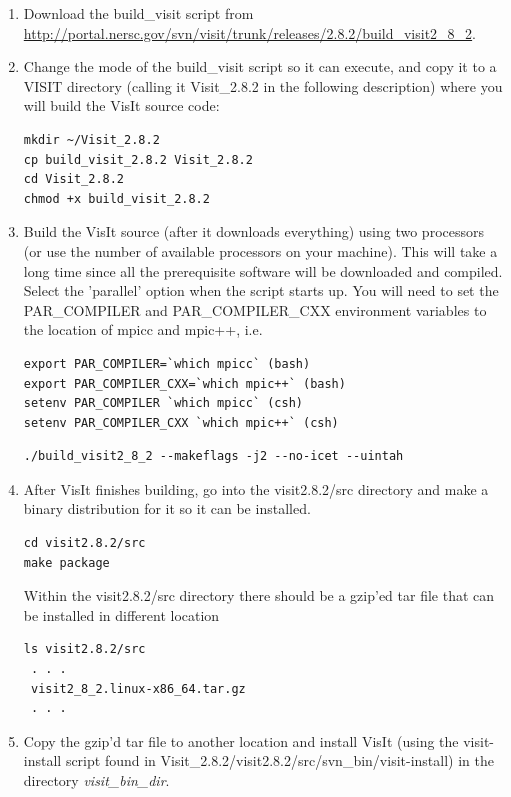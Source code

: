 \documentclass[12pt]{article}
\begin{document}
\begin{enumerate}
\item Download the build\_visit script from
  \url{http://portal.nersc.gov/svn/visit/trunk/releases/2.8.2/build_visit2_8_2}.


\item Change the mode of the build\_visit script so it can execute, and
  copy it to a VISIT directory (calling it Visit\_2.8.2 in the
  following description) where you will build the VisIt source code:
\begin{verbatim}
mkdir ~/Visit_2.8.2
cp build_visit_2.8.2 Visit_2.8.2
cd Visit_2.8.2
chmod +x build_visit_2.8.2
\end{verbatim}

\item Build the VisIt source (after it downloads everything) using two
  processors (or use the number of available processors on your
  machine). This will take a long time since all the prerequisite
  software will be downloaded and compiled. Select the 'parallel'
  option when the script starts up.  You will need to set the
  PAR\_COMPILER and PAR\_COMPILER\_CXX environment variables to the
  location of mpicc and mpic++, i.e.

\begin{verbatim}
export PAR_COMPILER=`which mpicc` (bash)
export PAR_COMPILER_CXX=`which mpic++` (bash)
setenv PAR_COMPILER `which mpicc` (csh)
setenv PAR_COMPILER_CXX `which mpic++` (csh)
\end{verbatim}

\begin{verbatim}
./build_visit2_8_2 --makeflags -j2 --no-icet --uintah
\end{verbatim}


\item After VisIt finishes building, go into the visit2.8.2/src
  directory and make a binary distribution for it so it can be
  installed.  
\begin{verbatim}
cd visit2.8.2/src
make package 
\end{verbatim}

Within the visit2.8.2/src directory there should be a gzip'ed tar
file that can be installed in different location 

\begin{verbatim}
ls visit2.8.2/src
 . . . 
 visit2_8_2.linux-x86_64.tar.gz
 . . .
\end{verbatim}

\item Copy the gzip'd tar file to another location and install VisIt
  (using the visit-install script found in
  Visit\_2.8.2/visit2.8.2/src/svn\_bin/visit-install) in the directory
  \emph{visit\_bin\_dir}.


\end{enumerate}
\end{document}
